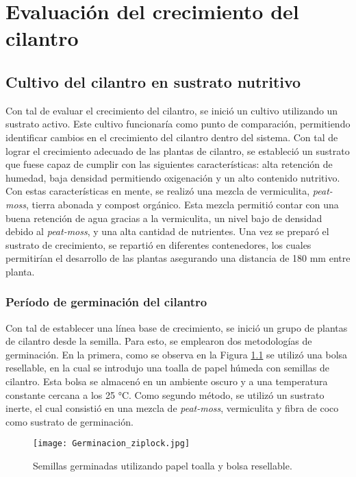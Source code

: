 \chapter{Evaluación del crecimiento del cilantro}

\section{Cultivo del cilantro en sustrato nutritivo}

Con tal de evaluar el crecimiento del cilantro, se inició un cultivo utilizando un sustrato activo. Este cultivo funcionaría como punto de comparación, permitiendo identificar cambios en el crecimiento del cilantro dentro del sistema. Con tal de lograr el crecimiento adecuado de las plantas de cilantro, se estableció un sustrato que fuese capaz de cumplir con las siguientes características: alta retención de humedad, baja densidad permitiendo oxigenación y un alto contenido nutritivo. Con estas características en mente, se realizó una mezcla de vermiculita, \textit{peat-moss}, tierra abonada y compost orgánico. Esta mezcla permitió contar con una buena retención de agua gracias a la vermiculita, un nivel bajo de densidad debido al \textit{peat-moss}, y una alta cantidad de nutrientes. Una vez se preparó el sustrato de crecimiento, se repartió en diferentes contenedores, los cuales permitirían el desarrollo de las plantas asegurando una distancia de 180 mm entre planta. 

\subsection{Período de germinación del cilantro}

Con tal de establecer una línea base de crecimiento, se inició un grupo de plantas de cilantro desde la semilla. Para esto, se emplearon dos metodologías de germinación. En la primera, como se observa en la Figura \ref{fig:ziplock} se utilizó una bolsa resellable, en la cual se introdujo una toalla de papel húmeda con semillas de cilantro. Esta bolsa se almacenó en un ambiente oscuro y a una temperatura constante cercana a los 25 °C. Como segundo método, se utilizó un sustrato inerte, el cual consistió en una mezcla de \textit{peat-moss}, vermiculita y fibra de coco como sustrato de germinación. 

\begin{figure}[H]
	\centering
	\texttt{[image: Germinacion\_ziplock.jpg]}
	\caption{Semillas germinadas utilizando papel toalla y bolsa resellable.}
	\label{fig:ziplock}
\end{figure}

